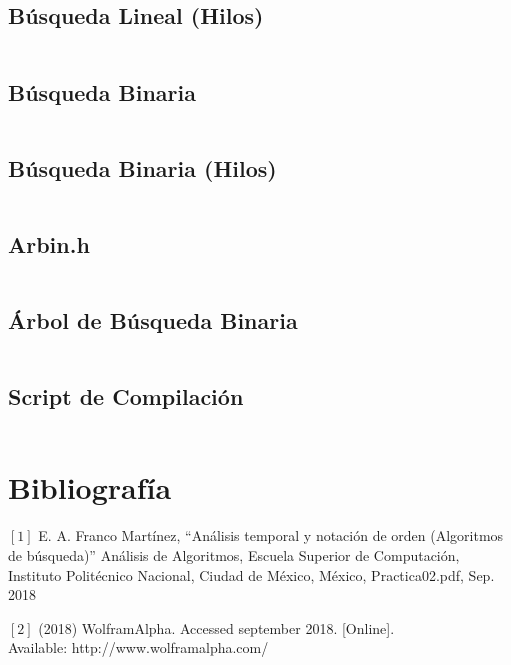 \documentclass[12pt]{article}
\begin{document}
		 \subsection{Búsqueda Lineal (Hilos)}
		    \inputminted{c++}{Code/LinealHilos.c}
		    
		 \subsection{Búsqueda Binaria}
		    \inputminted{c++}{Code/Binaria.c}
		 
		 \subsection{Búsqueda Binaria (Hilos)}
		    \inputminted{c++}{Code/BinariaHilos.c}
		 
		 \subsection{Arbin.h}
		    \inputminted{c++}{Code/Arbin.h}
		 
		 \subsection{Árbol de Búsqueda Binaria}
		    \inputminted{c++}{Code/ABB.c}
		 
		 \subsection{Script de Compilación}
		 \inputminted{c++}{Code/script.c}

	
	\section{Bibliografía}
	
	$[1]$ E. A. Franco Martínez, “Análisis temporal y notación de orden (Algoritmos de búsqueda)” Análisis de Algoritmos, Escuela Superior de Computación, Instituto Politécnico Nacional,
    Ciudad de México, México, Practica02.pdf, Sep. 2018
  
    $[2]$ (2018) WolframAlpha. Accessed september 2018. [Online]. \\Available: http://www.wolframalpha.com/

	\nocite{ref2}
	
     
\end{document}
